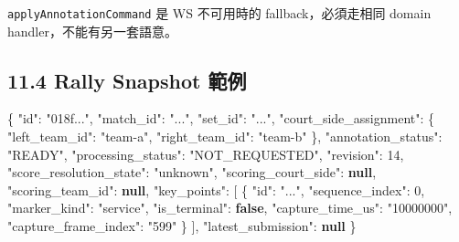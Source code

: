 \documentclass[
  9pt,
  a4paper,
]{article}
\newenvironment{Shaded}{}{}
\newcommand{\DataTypeTok}[1]{\textcolor[rgb]{0.56,0.13,0.00}{#1}}
\newcommand{\DecValTok}[1]{\textcolor[rgb]{0.25,0.63,0.44}{#1}}
\newcommand{\FunctionTok}[1]{\textcolor[rgb]{0.02,0.16,0.49}{#1}}
\newcommand{\KeywordTok}[1]{\textcolor[rgb]{0.00,0.44,0.13}{\textbf{#1}}}
\newcommand{\OtherTok}[1]{\textcolor[rgb]{0.00,0.44,0.13}{#1}}
\newcommand{\StringTok}[1]{\textcolor[rgb]{0.25,0.44,0.63}{#1}}
\begin{document}
\texttt{applyAnnotationCommand} 是 WS 不可用時的 fallback，必須走相同
domain handler，不能有另一套語意。

\subsection{11.4 Rally Snapshot
範例}\label{114-rally-snapshot-ux7bc4ux4f8b}

\begin{Shaded}
\begin{Highlighting}[]
\FunctionTok{\{}
  \DataTypeTok{"id"}\FunctionTok{:} \StringTok{"018f..."}\FunctionTok{,}
  \DataTypeTok{"match\_\allowbreak{}id"}\FunctionTok{:} \StringTok{"..."}\FunctionTok{,}
  \DataTypeTok{"set\_\allowbreak{}id"}\FunctionTok{:} \StringTok{"..."}\FunctionTok{,}
  \DataTypeTok{"court\_\allowbreak{}side\_\allowbreak{}assignment"}\FunctionTok{:} \FunctionTok{\{}
    \DataTypeTok{"left\_\allowbreak{}team\_\allowbreak{}id"}\FunctionTok{:} \StringTok{"team{-}a"}\FunctionTok{,}
    \DataTypeTok{"right\_\allowbreak{}team\_\allowbreak{}id"}\FunctionTok{:} \StringTok{"team{-}b"}
  \FunctionTok{\},}
  \DataTypeTok{"annotation\_\allowbreak{}status"}\FunctionTok{:} \StringTok{"READY"}\FunctionTok{,}
  \DataTypeTok{"processing\_\allowbreak{}status"}\FunctionTok{:} \StringTok{"NOT\_\allowbreak{}REQUESTED"}\FunctionTok{,}
  \DataTypeTok{"revision"}\FunctionTok{:} \DecValTok{14}\FunctionTok{,}
  \DataTypeTok{"score\_\allowbreak{}resolution\_\allowbreak{}state"}\FunctionTok{:} \StringTok{"unknown"}\FunctionTok{,}
  \DataTypeTok{"scoring\_\allowbreak{}court\_\allowbreak{}side"}\FunctionTok{:} \KeywordTok{null}\FunctionTok{,}
  \DataTypeTok{"scoring\_\allowbreak{}team\_\allowbreak{}id"}\FunctionTok{:} \KeywordTok{null}\FunctionTok{,}
  \DataTypeTok{"key\_\allowbreak{}points"}\FunctionTok{:} \OtherTok{[}
    \FunctionTok{\{}
      \DataTypeTok{"id"}\FunctionTok{:} \StringTok{"..."}\FunctionTok{,}
      \DataTypeTok{"sequence\_\allowbreak{}index"}\FunctionTok{:} \DecValTok{0}\FunctionTok{,}
      \DataTypeTok{"marker\_\allowbreak{}kind"}\FunctionTok{:} \StringTok{"service"}\FunctionTok{,}
      \DataTypeTok{"is\_\allowbreak{}terminal"}\FunctionTok{:} \KeywordTok{false}\FunctionTok{,}
      \DataTypeTok{"capture\_\allowbreak{}time\_\allowbreak{}us"}\FunctionTok{:} \StringTok{"10000000"}\FunctionTok{,}
      \DataTypeTok{"capture\_\allowbreak{}frame\_\allowbreak{}index"}\FunctionTok{:} \StringTok{"599"}
    \FunctionTok{\}}
  \OtherTok{]}\FunctionTok{,}
  \DataTypeTok{"latest\_\allowbreak{}submission"}\FunctionTok{:} \KeywordTok{null}
\FunctionTok{\}}
\end{Highlighting}
\end{Shaded}
\end{document}

